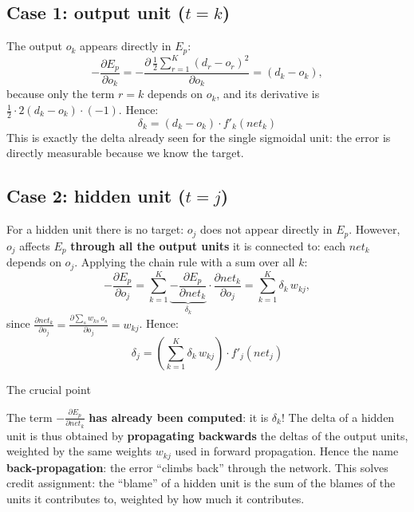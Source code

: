 \subsection{\texorpdfstring{Case 1: output unit
(\(t = k\))}{Case 1: output unit (t = k)}}\label{caso-1-unituxe0-di-uscita-t-k}

The output \(o_k\) appears directly in \(E_p\): \[
-\frac{\partial E_p}{\partial o_k} = -\frac{\partial\,\frac{1}{2}\sum_{r=1}^{K}(d_r - o_r)^2}{\partial o_k} = (d_k - o_k),
\] because only the term \(r = k\) depends on \(o_k\), and its
derivative is \(\frac{1}{2}\cdot 2(d_k - o_k)\cdot(-1)\). Hence: \[
\boxed{\delta_k = (d_k - o_k)\cdot f'_k(net_k)}
\] This is exactly the delta already seen for the single sigmoidal
unit: the error is directly measurable because we know the target.

\subsection{\texorpdfstring{Case 2: hidden unit
(\(t = j\))}{Case 2: hidden unit (t = j)}}\label{caso-2-unituxe0-nascosta-t-j}

For a hidden unit there is no target: \(o_j\) does not appear directly
in \(E_p\). However, \(o_j\) affects \(E_p\) \textbf{through all the
output units} it is connected to: each \(net_k\) depends on \(o_j\).
Applying the chain rule with a sum over all \(k\): \[
-\frac{\partial E_p}{\partial o_j} = \sum_{k=1}^{K}\underbrace{-\frac{\partial E_p}{\partial net_k}}_{\delta_k}\cdot\frac{\partial net_k}{\partial o_j} = \sum_{k=1}^{K}\delta_k\, w_{kj},
\] since
\(\frac{\partial net_k}{\partial o_j} = \frac{\partial \sum_s w_{ks}\,o_s}{\partial o_j} = w_{kj}\).
Hence: \[
\boxed{\delta_j = \left(\sum_{k=1}^{K}\delta_k\, w_{kj}\right)\cdot f'_j(net_j)}
\]

\begin{boxtip}{The crucial point}

The term \(-\frac{\partial E_p}{\partial net_k}\) \textbf{has already
been computed}: it is \(\delta_k\)! The delta of a hidden unit is thus
obtained by \textbf{propagating backwards} the deltas of the output
units, weighted by the same weights \(w_{kj}\) used in forward
propagation. Hence the name \textbf{back-propagation}: the error
``climbs back'' through the network. This solves credit assignment: the
``blame'' of a hidden unit is the sum of the blames of the units it
contributes to, weighted by how much it contributes.

\end{boxtip}

